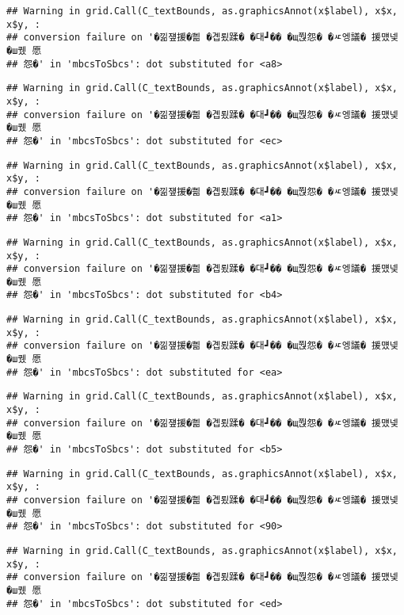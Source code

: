 \documentclass[
]{article}
\begin{document}
\begin{verbatim}
## Warning in grid.Call(C_textBounds, as.graphicsAnnot(x$label), x$x, x$y, :
## conversion failure on '�낆쟾援�쁾 �곕룄蹂� �대┛�� �щ쭩怨� �ㅼ엥議� 援먰넻�ш퀬 愿
## 怨�' in 'mbcsToSbcs': dot substituted for <a8>
\end{verbatim}

\begin{verbatim}
## Warning in grid.Call(C_textBounds, as.graphicsAnnot(x$label), x$x, x$y, :
## conversion failure on '�낆쟾援�쁾 �곕룄蹂� �대┛�� �щ쭩怨� �ㅼ엥議� 援먰넻�ш퀬 愿
## 怨�' in 'mbcsToSbcs': dot substituted for <ec>
\end{verbatim}

\begin{verbatim}
## Warning in grid.Call(C_textBounds, as.graphicsAnnot(x$label), x$x, x$y, :
## conversion failure on '�낆쟾援�쁾 �곕룄蹂� �대┛�� �щ쭩怨� �ㅼ엥議� 援먰넻�ш퀬 愿
## 怨�' in 'mbcsToSbcs': dot substituted for <a1>
\end{verbatim}

\begin{verbatim}
## Warning in grid.Call(C_textBounds, as.graphicsAnnot(x$label), x$x, x$y, :
## conversion failure on '�낆쟾援�쁾 �곕룄蹂� �대┛�� �щ쭩怨� �ㅼ엥議� 援먰넻�ш퀬 愿
## 怨�' in 'mbcsToSbcs': dot substituted for <b4>
\end{verbatim}

\begin{verbatim}
## Warning in grid.Call(C_textBounds, as.graphicsAnnot(x$label), x$x, x$y, :
## conversion failure on '�낆쟾援�쁾 �곕룄蹂� �대┛�� �щ쭩怨� �ㅼ엥議� 援먰넻�ш퀬 愿
## 怨�' in 'mbcsToSbcs': dot substituted for <ea>
\end{verbatim}

\begin{verbatim}
## Warning in grid.Call(C_textBounds, as.graphicsAnnot(x$label), x$x, x$y, :
## conversion failure on '�낆쟾援�쁾 �곕룄蹂� �대┛�� �щ쭩怨� �ㅼ엥議� 援먰넻�ш퀬 愿
## 怨�' in 'mbcsToSbcs': dot substituted for <b5>
\end{verbatim}

\begin{verbatim}
## Warning in grid.Call(C_textBounds, as.graphicsAnnot(x$label), x$x, x$y, :
## conversion failure on '�낆쟾援�쁾 �곕룄蹂� �대┛�� �щ쭩怨� �ㅼ엥議� 援먰넻�ш퀬 愿
## 怨�' in 'mbcsToSbcs': dot substituted for <90>
\end{verbatim}

\begin{verbatim}
## Warning in grid.Call(C_textBounds, as.graphicsAnnot(x$label), x$x, x$y, :
## conversion failure on '�낆쟾援�쁾 �곕룄蹂� �대┛�� �щ쭩怨� �ㅼ엥議� 援먰넻�ш퀬 愿
## 怨�' in 'mbcsToSbcs': dot substituted for <ed>
\end{verbatim}
\end{document}
